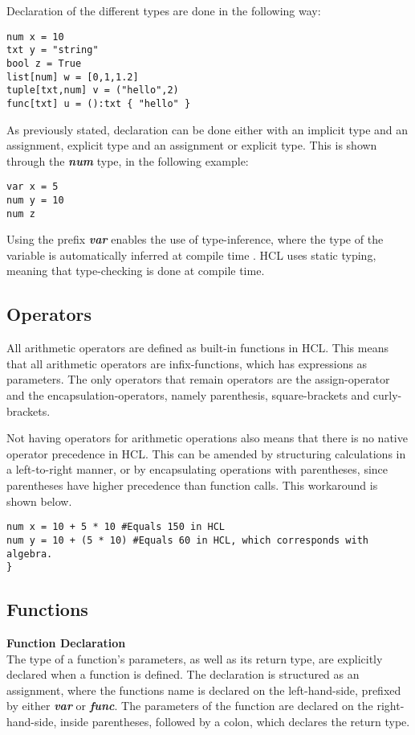 Declaration of the different types are done in the following way:
\begin{lstlisting}[language=HCL,label=lis:typedcls,firstnumber=1]
num x = 10
txt y = "string"
bool z = True
list[num] w = [0,1,1.2]
tuple[txt,num] v = ("hello",2)
func[txt] u = ():txt { "hello" }
\end{lstlisting}

As previously stated, declaration can be done either with an implicit type and an assignment, explicit type and an assignment or explicit type.
This is shown through the \textbf{\textit{num}} type, in the following example:

\begin{lstlisting}[language=HCL,firstnumber=1]
var x = 5
num y = 10
num z

\end{lstlisting}

Using the prefix \textbf{\textit{var}} enables the use of type-inference, where the type of the variable is automatically inferred at compile time \cite{typeinf}.
HCL uses static typing, meaning that type-checking is done at compile time.

\subsection{Operators}
All arithmetic operators are defined as built-in functions in HCL.
This means that all arithmetic operators are infix-functions, which has expressions as parameters. 
The only operators that remain operators are the assign-operator and the encapsulation-operators, namely parenthesis, square-brackets and curly-brackets.

Not having operators for arithmetic operations also means that there is no native operator precedence in HCL.
This can be amended by structuring calculations in a left-to-right manner, or by encapsulating operations with parentheses, since parentheses have higher precedence than function calls. 
This workaround is shown below.

\begin{lstlisting}[language=HCL,firstnumber=1]
num x = 10 + 5 * 10 #Equals 150 in HCL
num y = 10 + (5 * 10) #Equals 60 in HCL, which corresponds with algebra.
}
\end{lstlisting}

\subsection{Functions}
\textbf{Function Declaration}\\
The type of a function's parameters, as well as its return type, are explicitly declared when a function is defined. 
The declaration is structured as an assignment, where the functions name is declared on the left-hand-side, prefixed by either \textbf{\textit{var}} or \textbf{\textit{func}}. 
The parameters of the function are declared on the right-hand-side, inside parentheses, followed by a colon, which declares the return type. 

